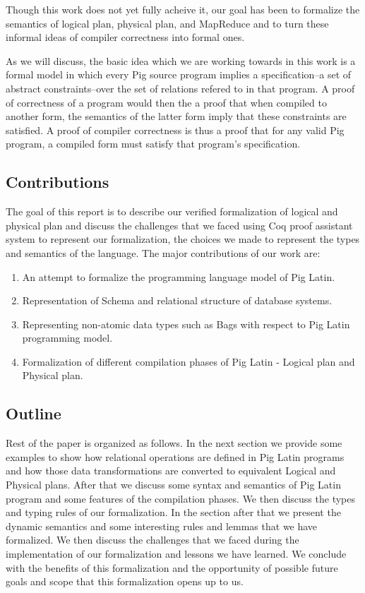 Though this work does not yet fully acheive it, our goal has been to formalize the semantics of logical plan, physical plan, and MapReduce and to turn these informal ideas of compiler correctness into formal ones.

As we will discuss, the basic idea which we are working towards in this work is a formal model in which every Pig source program implies a specification--a set of abstract constraints--over the set of relations refered to in that program. A proof of correctness of a program would then the a proof that when compiled to another form, the semantics of the latter form imply that these constraints are satisfied. A proof of compiler correctness is thus a proof that for any valid Pig program, a compiled form must satisfy that program's specification.


\subsection{Contributions}
\label{subsec:contrib}

The goal of this report is to describe our verified formalization of logical and physical plan and discuss the challenges that we faced using Coq proof assistant system to represent our formalization, the choices we made to represent the types and semantics of the language.
The major contributions of our work are:
\begin{enumerate}
	\item An attempt to formalize the programming language model of Pig Latin.
	\item Representation of Schema and relational structure of database systems.
	\item Representing non-atomic data types such as Bags with respect to Pig Latin programming model.
	\item Formalization of different compilation phases of Pig Latin - Logical plan and Physical plan.
\end{enumerate}

\subsection{Outline}
\label{subsec:outline}

Rest of the paper is organized as follows. In the next section we provide some examples to show how relational operations are defined in Pig Latin programs and how those data transformations are converted to equivalent Logical and Physical plans. After that we discuss some syntax and semantics of Pig Latin program and some features of the compilation phases. We then discuss the types and typing rules of our formalization. In the section after that
we present the dynamic semantics and some interesting rules and lemmas that we have formalized. We then discuss the challenges that we faced during the implementation of our formalization and lessons we have learned. We conclude with the benefits of this formalization and the opportunity of possible future goals and scope that this formalization opens up to us.

